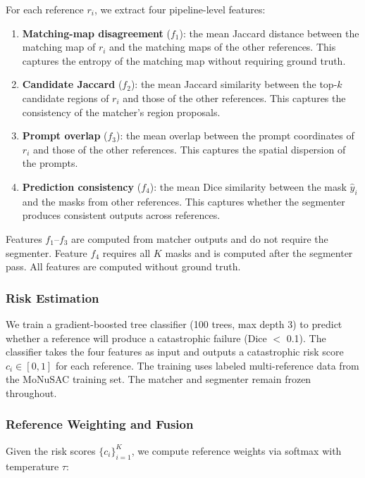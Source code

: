 \documentclass[11pt]{article}
\begin{document}
For each reference $r_i$, we extract four pipeline-level features:

\begin{enumerate}[leftmargin=*]
\item \textbf{Matching-map disagreement} ($f_1$): the mean Jaccard distance
  between the matching map of $r_i$ and the matching maps of the other
  references. This captures the entropy of the matching map without requiring
  ground truth.
\item \textbf{Candidate Jaccard} ($f_2$): the mean Jaccard similarity
  between the top-$k$ candidate regions of $r_i$ and those of the other
  references. This captures the consistency of the matcher's region
  proposals.
\item \textbf{Prompt overlap} ($f_3$): the mean overlap between the
  prompt coordinates of $r_i$ and those of the other references. This
  captures the spatial dispersion of the prompts.
\item \textbf{Prediction consistency} ($f_4$): the mean Dice similarity
  between the mask $\hat{y}_i$ and the masks from other references. This
  captures whether the segmenter produces consistent outputs across
  references.
\end{enumerate}

Features $f_1$--$f_3$ are computed from matcher outputs and do not require
the segmenter. Feature $f_4$ requires all $K$ masks and is computed after
the segmenter pass. All features are computed without ground truth.

\subsubsection{Risk Estimation}

We train a gradient-boosted tree classifier (100 trees, max depth 3) to
predict whether a reference will produce a catastrophic failure (Dice $<$
0.1). The classifier takes the four features as input and outputs a
catastrophic risk score $c_i \in [0, 1]$ for each reference. The training
uses labeled multi-reference data from the MoNuSAC training set. The matcher
and segmenter remain frozen throughout.

\subsubsection{Reference Weighting and Fusion}

Given the risk scores $\{c_i\}_{i=1}^K$, we compute reference weights via
softmax with temperature $\tau$:
\end{document}
